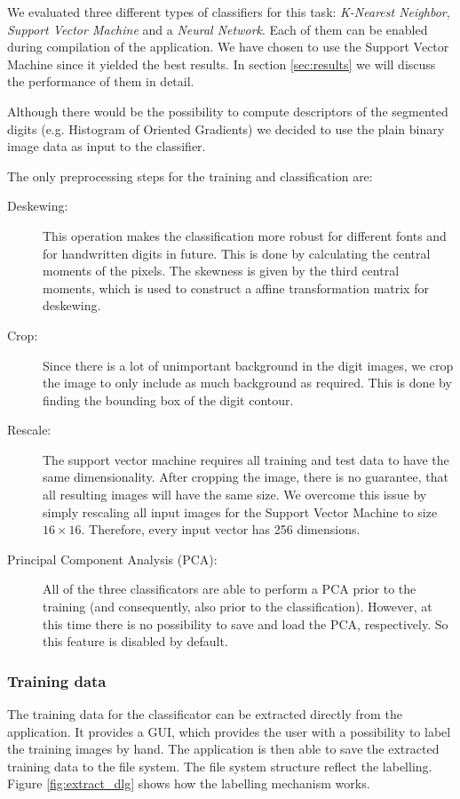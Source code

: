 \documentclass[
a4paper,     %
12pt         %
]{scrartcl}  %
\begin{document}
We evaluated three different types of classifiers for this task: \emph{K-Nearest Neighbor},
\emph{Support Vector Machine} and a \emph{Neural Network}. Each of them can be enabled
during compilation of the application. We have chosen to use the Support Vector Machine
since it yielded the best results. In section \ref{sec:results} we will discuss the performance
of them in detail.

Although there would be the possibility to compute descriptors of the segmented digits
(e.g. Histogram of Oriented Gradients) we decided to use the plain binary image data
as input to the classifier.

The only preprocessing steps for the training and classification are:

\begin{description}
  \item[Deskewing:] This operation makes the classification more robust for different
  fonts and for handwritten digits in future. This is done by calculating the central
  moments of the pixels. The skewness is given by the third central moments, which is
  used to construct a affine transformation matrix for deskewing.
  \item[Crop:] Since there is a lot of unimportant background in the digit images, we
  crop the image to only include as much background as required. This is done by finding
  the bounding box of the digit contour.
  \item[Rescale:] The support vector machine requires all training and test data to have
  the same dimensionality. After cropping the image, there is no guarantee, that all resulting
  images will have the same size. We overcome this issue by simply rescaling all input
  images for the Support Vector Machine to size $16 \times 16$. Therefore, every input
  vector has 256 dimensions.
  \item[Principal Component Analysis (PCA):] All of the three classificators are able to
  perform a PCA prior to the training (and consequently, also prior to the classification).
  However, at this time there is no possibility to save and load the PCA, respectively.
  So this feature is disabled by default. 
\end{description}

\subsubsection{Training data}

The training data for the classificator can be extracted directly from the application. It
provides a GUI, which provides the user with a possibility to label the training images
by hand. The application is then able to save the extracted training data to the file system.
The file system structure reflect the labelling. Figure \ref{fig:extract_dlg} shows how the
labelling mechanism works.
\end{document}
